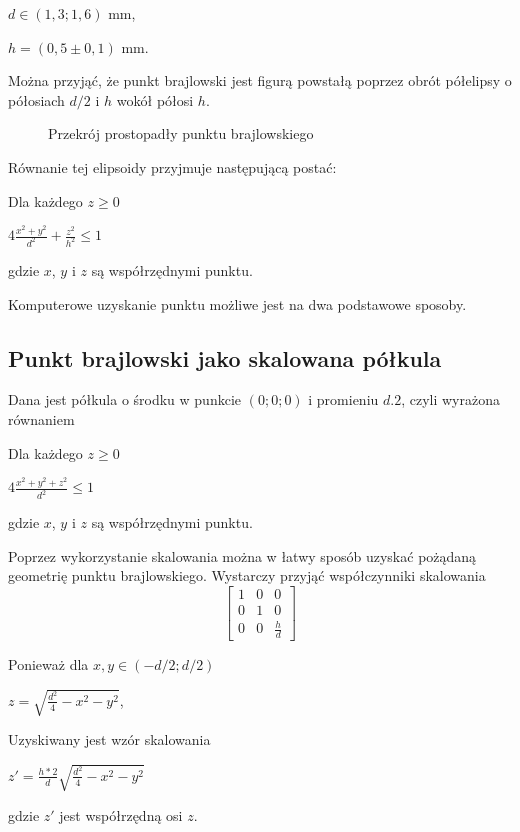 \documentclass[12pt,a4paper]{article}
\begin{document}
$d \in (1{,}3; 1{,}6) \text{ mm}$,

$h = (0{,}5 \pm 0{,}1) \text{ mm}$.

Można przyjąć, że punkt brajlowski jest figurą powstałą poprzez obrót półelipsy o półosiach $d/2$ i $h$ wokół półosi $h$.

\begin{figure}
\centering
{}
\caption{Przekrój prostopadły punktu brajlowskiego}
\end{figure}

Równanie tej elipsoidy przyjmuje następującą postać:
\begin{feq}
Dla każdego $z \geq 0$

$4\frac{x^2+y^2}{d^2} + \frac{z^2}{h^2} \leq 1$

gdzie $x$, $y$ i $z$ są współrzędnymi punktu.
\caption{Elipsoida punktu brajlowskiego}
\end{feq}

Komputerowe uzyskanie punktu możliwe jest na dwa podstawowe sposoby.

\subsection{Punkt brajlowski jako skalowana półkula}
Dana jest półkula o środku w punkcie $(0;0;0)$ i promieniu $d.2$, czyli wyrażona równaniem

Dla każdego $z \geq 0$

$4\frac{x^2+y^2+z^2}{d^2} \leq 1$

gdzie $x$, $y$ i $z$ są współrzędnymi punktu.

Poprzez wykorzystanie skalowania można w łatwy sposób uzyskać pożądaną geometrię punktu brajlowskiego. Wystarczy przyjąć współczynniki skalowania
$$
\begin{bmatrix}
1 & 0 & 0 \\
0 & 1 & 0 \\
0 & 0 & \frac{h}{d}
\end{bmatrix}
$$

Ponieważ dla $x,y \in (-d/2; d/2)$

$z = \sqrt{\frac{d^2}{4} - x^2 - y^2}$,

Uzyskiwany jest wzór skalowania

\begin{feq}
$z' = \frac{h*2}{d} \sqrt{\frac{d^2}{4} - x^2 - y^2}$

gdzie $z'$ jest współrzędną osi $z$.
\caption{Skalowanie półkuli do półelipsoidy punktu Brajlowskiego}
\end{feq}
\end{document}
